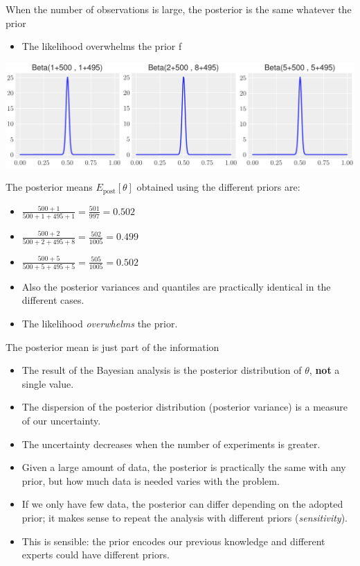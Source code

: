 \documentclass[
  13pt,
  ignorenonframetext,
]{beamer}
\providecommand{\tightlist}{%
  \setlength{\itemsep}{0pt}\setlength{\parskip}{0pt}}
\begin{document}
\begin{frame}{When the number of observations is large, the posterior is
the same whatever the prior}
\protect\hypertarget{when-the-number-of-observations-is-large-the-posterior-is-the-same-whatever-the-prior}{}
\begin{itemize}
\tightlist
\item
  The likelihood overwhelms the prior f
\end{itemize}

\begin{center}\includegraphics{3-coinTossing_files/figure-beamer/unnamed-chunk-12-7} \end{center}

The posterior means \(E_{\text{post}}[\theta]\) obtained using the
different priors are:

\begin{itemize}
\item
  \(\frac{500+1}{500+1+495+1}=\frac{501}{997}=0.502\)
\item
  \(\frac{500+2}{500+2+495+8}=\frac{502}{1005}=0.499\)
\item
  \(\frac{500+5}{500+5+495+5}=\frac{505}{1005}=0.502\)
\item
  Also the posterior variances and quantiles are practically identical
  in the different cases.
\item
  The likelihood \emph{overwhelms} the prior.
\end{itemize}
\end{frame}

\begin{frame}{The posterior mean is just part of the information}
\protect\hypertarget{the-posterior-mean-is-just-part-of-the-information}{}
\begin{itemize}
\item
  The result of the Bayesian analysis is the posterior distribution of
  \(\theta\), \textbf{not} a single value.
\item
  The dispersion of the posterior distribution (posterior variance) is a
  measure of our uncertainty.
\item
  The uncertainty decreases when the number of experiments is greater.
\item
  Given a large amount of data, the posterior is practically the same
  with any prior, but how much data is needed varies with the problem.
\item
  If we only have few data, the posterior can differ depending on the
  adopted prior; it makes sense to repeat the analysis with different
  priors (\emph{sensitivity}).
\item
  This is sensible: the prior encodes our previous knowledge and
  different experts could have different priors.
\end{itemize}
\end{frame}
\end{document}

